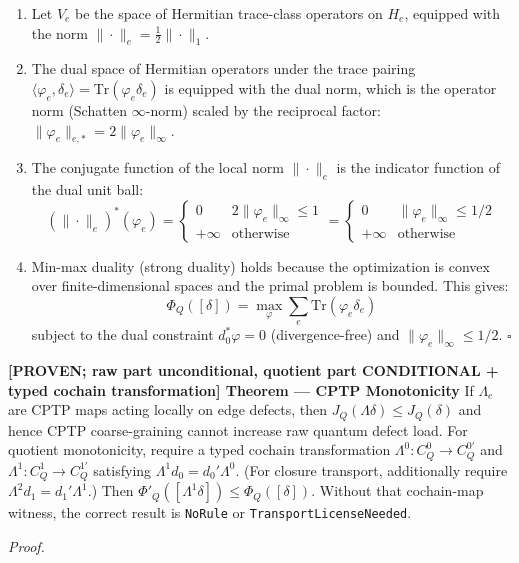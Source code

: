 \documentclass[
  11pt,
]{article}
\renewenvironment{quote}
  {\begin{leftbar}\small}
  {\end{leftbar}}
\begin{document}
\begin{quote}
\begin{enumerate}
\def\labelenumi{\arabic{enumi}.}
\item
  Let \(V_e\) be the space of Hermitian trace-class operators on \(H_e\), equipped with the norm \(\|\cdot\|_e = \frac{1}{2} \|\cdot\|_1\).
\item
  The dual space of Hermitian operators under the trace pairing \(\langle \varphi_e, \delta_e \rangle = \text{Tr}(\varphi_e \delta_e)\) is equipped with the dual norm, which is the operator norm (Schatten \(\infty\)-norm) scaled by the reciprocal factor: \(\|\varphi_e\|_{e, *} = 2 \|\varphi_e\|_\infty\).
\item
  The conjugate function of the local norm \(\|\cdot\|_e\) is the indicator function of the dual unit ball:
  \[(\|\cdot\|_e)^*(\varphi_e) = \begin{cases} 0 & 2 \|\varphi_e\|_\infty \le 1 \\ +\infty & \text{otherwise} \end{cases} = \begin{cases} 0 & \|\varphi_e\|_\infty \le 1/2 \\ +\infty & \text{otherwise} \end{cases}\]
\item
  Min-max duality (strong duality) holds because the optimization is convex over finite-dimensional spaces and the primal problem is bounded. This gives:
  \[\Phi_Q([\delta]) = \max_{\varphi} \sum_e \text{Tr}(\varphi_e \delta_e)\]
  subject to the dual constraint \(d_0^*\varphi = 0\) (divergence-free) and \(\|\varphi_e\|_\infty \le 1/2\). \(\square\)
\end{enumerate}

\textbf{{[}PROVEN; raw part unconditional, quotient part CONDITIONAL + typed cochain transformation{]} Theorem --- CPTP Monotonicity}
If \(\Lambda_e\) are CPTP maps acting locally on edge defects, then \(J_Q(\Lambda\delta) \le J_Q(\delta)\) and hence CPTP coarse-graining cannot increase raw quantum defect load. For quotient monotonicity, require a typed cochain transformation \(\Lambda^0:C^0_Q\to C^{0\prime}_Q\) and \(\Lambda^1:C^1_Q\to C^{1\prime}_Q\) satisfying \(\Lambda^1d_0=d_0'\Lambda^0\). (For closure transport, additionally require \(\Lambda^2d_1=d_1'\Lambda^1\).) Then \(\Phi'_Q([\Lambda^1\delta]) \le \Phi_Q([\delta])\). Without that cochain-map witness, the correct result is \texttt{NoRule} or \texttt{TransportLicenseNeeded}.

\emph{Proof.}


\end{quote}
\end{document}
